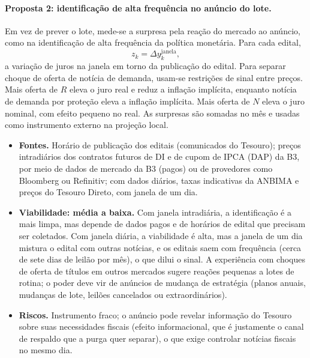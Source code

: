 \documentclass[12pt,a4paper]{article}
\begin{document}
\paragraph{Proposta 2: identificação de alta frequência no anúncio do lote.}
Em vez de prever o lote, mede-se a surpresa pela reação do mercado ao anúncio,
como na identificação de alta frequência da política monetária. Para cada edital,
\[
z_k=\Delta y^{\mathrm{janela}}_{k},
\]
a variação de juros na janela em torno da publicação do edital. Para separar choque
de oferta de notícia de demanda, usam-se restrições de sinal entre preços. Mais
oferta de \(R\) eleva o juro real e reduz a inflação implícita, enquanto notícia de
demanda por proteção eleva a inflação implícita. Mais oferta de \(N\) eleva o juro
nominal, com efeito pequeno no real. As surpresas são somadas no mês e usadas como
instrumento externo na projeção local.
\begin{itemize}[leftmargin=1.2cm]
    \item \textbf{Fontes.} Horário de publicação dos editais (comunicados do Tesouro);
    preços intradiários dos contratos futuros de DI e de cupom de IPCA (DAP) da B3,
    por meio de dados de mercado da B3 (pagos) ou de provedores como Bloomberg ou
    Refinitiv; com dados diários, taxas indicativas da ANBIMA e preços do Tesouro
    Direto, com janela de um dia.
    \item \textbf{Viabilidade: média a baixa.} Com janela intradiária, a identificação
    é a mais limpa, mas depende de dados pagos e de horários de edital que precisam
    ser coletados. Com janela diária, a viabilidade é alta, mas a janela de um dia
    mistura o edital com outras notícias, e os editais saem com frequência (cerca de
    sete dias de leilão por mês), o que dilui o sinal. A experiência com choques de
    oferta de títulos em outros mercados sugere reações pequenas a lotes de rotina;
    o poder deve vir de anúncios de mudança de estratégia (planos anuais, mudanças
    de lote, leilões cancelados ou extraordinários).
    \item \textbf{Riscos.} Instrumento fraco; o anúncio pode revelar informação do
    Tesouro sobre suas necessidades fiscais (efeito informacional, que é justamente
    o canal de respaldo que a purga quer separar), o que exige controlar notícias
    fiscais no mesmo dia.
\end{itemize}
\end{document}
